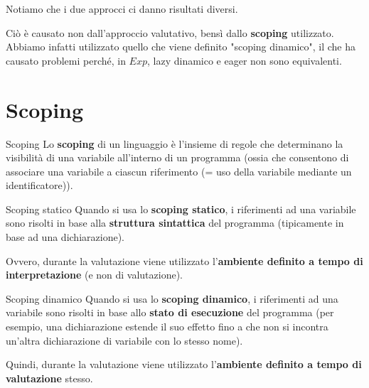\documentclass[a4paper,11pt]{report}
\begin{document}
\begin{prooftree}
\end{prooftree}

Notiamo che i due approcci ci danno risultati diversi.

Ciò è causato non dall'approccio valutativo, bensì dallo \textbf{scoping} utilizzato. Abbiamo infatti utilizzato quello che viene definito "scoping dinamico", il che ha causato problemi perché, in \( Exp \), lazy dinamico e eager non sono equivalenti.

\section{Scoping}

\begin{defframe}{Scoping}{}
    Lo \textbf{scoping} di un linguaggio è l'insieme di regole che determinano la visibilità di una variabile all'interno di un programma (ossia che consentono di associare una variabile a ciascun riferimento {\small \color{gray} (= uso della variabile mediante un identificatore)}).
\end{defframe}

\begin{defframe}{Scoping statico}{}
    Quando si usa lo \textbf{scoping statico}, i riferimenti ad una variabile sono risolti in base alla \textbf{struttura sintattica} del programma (tipicamente in base ad una dichiarazione).

    Ovvero, durante la valutazione viene utilizzato l'\textbf{ambiente definito a tempo di interpretazione} (e non di valutazione).
\end{defframe}

\begin{defframe}{Scoping dinamico}{}
    Quando si usa lo \textbf{scoping dinamico}, i riferimenti ad una variabile sono risolti in base allo \textbf{stato di esecuzione} del programma (per esempio, una dichiarazione estende il suo effetto fino a che non si incontra un'altra dichiarazione di variabile con lo stesso nome).

    Quindi, durante la valutazione viene utilizzato l'\textbf{ambiente definito a tempo di valutazione} stesso.
\end{defframe}
\end{document}
